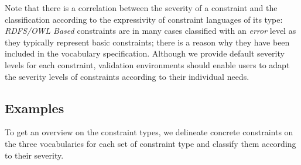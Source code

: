 \documentclass[conference]{IEEEtran}
\newcommand{\ke}[1]{\todo[size=\small, color=red!40]{\textbf{Kai:} #1}}
\newcommand{\tb}[1]{\todo[size=\small, color=green!40]{\textbf{Thomas:} #1}}
\begin{document}
Note that there is a correlation between the severity of a constraint and the classification according to the expressivity of constraint languages of its type: \emph{RDFS/OWL Based} constraints are in many cases classified with an \emph{error} level as they typically represent basic constraints; there is a reason why they have been included in the vocabulary specification. Although we provide default severity levels for each constraint, validation environments should enable users to adapt the severity levels of constraints according to their individual needs.

%
%
%

%


\subsection{Examples}
\label{vocabulary-constraint-types}

To get an overview on the constraint types, we delineate concrete constraints on the three vocabularies for each set of constraint type and classify them according to their severity.
\end{document}
